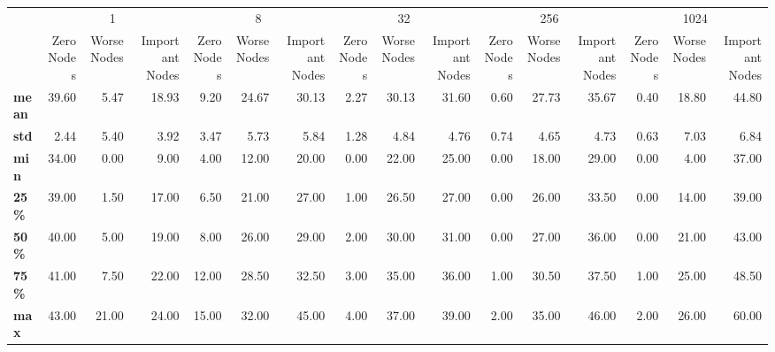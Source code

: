 \begin{tabular}{lrrrrrrrrrrrrrrr}
\toprule
{} & \multicolumn{3}{c}{1} & \multicolumn{3}{c}{8} & \multicolumn{3}{c}{32} & \multicolumn{3}{c}{256} & \multicolumn{3}{c}{1024} \\
{} & Zero Nodes & Worse Nodes & Important Nodes & Zero Nodes & Worse Nodes & Important Nodes & Zero Nodes & Worse Nodes & Important Nodes & Zero Nodes & Worse Nodes & Important Nodes & Zero Nodes & Worse Nodes & Important Nodes \\
\midrule
\textbf{mean} &      39.60 &        5.47 &           18.93 &       9.20 &       24.67 &           30.13 &       2.27 &       30.13 &           31.60 &       0.60 &       27.73 &           35.67 &       0.40 &       18.80 &           44.80 \\
\textbf{std } &       2.44 &        5.40 &            3.92 &       3.47 &        5.73 &            5.84 &       1.28 &        4.84 &            4.76 &       0.74 &        4.65 &            4.73 &       0.63 &        7.03 &            6.84 \\
\textbf{min } &      34.00 &        0.00 &            9.00 &       4.00 &       12.00 &           20.00 &       0.00 &       22.00 &           25.00 &       0.00 &       18.00 &           29.00 &       0.00 &        4.00 &           37.00 \\
\textbf{25\% } &      39.00 &        1.50 &           17.00 &       6.50 &       21.00 &           27.00 &       1.00 &       26.50 &           27.00 &       0.00 &       26.00 &           33.50 &       0.00 &       14.00 &           39.00 \\
\textbf{50\% } &      40.00 &        5.00 &           19.00 &       8.00 &       26.00 &           29.00 &       2.00 &       30.00 &           31.00 &       0.00 &       27.00 &           36.00 &       0.00 &       21.00 &           43.00 \\
\textbf{75\% } &      41.00 &        7.50 &           22.00 &      12.00 &       28.50 &           32.50 &       3.00 &       35.00 &           36.00 &       1.00 &       30.50 &           37.50 &       1.00 &       25.00 &           48.50 \\
\textbf{max } &      43.00 &       21.00 &           24.00 &      15.00 &       32.00 &           45.00 &       4.00 &       37.00 &           39.00 &       2.00 &       35.00 &           46.00 &       2.00 &       26.00 &           60.00 \\
\bottomrule
\end{tabular}
